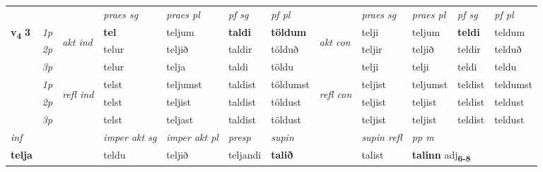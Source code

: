 \begin{longtable}[l]{X>{\footnotesize\itshape}llXXXXlXXXX}
 & &   & \textit{praes sg}  & \textit{praes pl}    & \textit{ pf sg} & \textit{pf pl} & & \textit{praes sg}  & \textit{praes pl}    & \textit{pf sg} & \textit{pf pl }  \\ \cmidrule{4-7} \cmidrule{9-12}
 \multirow{2}{*}{{{\textbf{v{\textsubscript{4}}} \Large{\textbf{3}}}}}  & 1p & \multirow{3}{*}{\begin{turn}{90}\textit{akt ind}\end{turn}} & \textbf{tel} & teljum & \textbf{taldi} & \textbf{töldum} & \multirow{3}{*}{\begin{turn}{90}\textit{akt con}\end{turn}} &telji & teljum & \textbf{teldi} & teldum\\*
 & 2p &  &  telur  & teljið & taldir & tölduð & & teljir & teljið & teldir & telduð \\*
 & 3p &  & telur & telja & taldi & töldu & & telji & telji& teldi & teldu \\*
\cmidrule{4-7} \cmidrule{9-12}
 & 1p & \multirow{3}{*}{\begin{turn}{90}\textit{refl ind}\end{turn}}  & telst & teljumst & taldist & töldumst & \multirow{3}{*}{\begin{turn}{90}\textit{refl con}\end{turn}}  &teljist & teljumst & teldist & teldumst \\*
 & 2p &  & telst & teljist & taldist & töldust & &teljist & teljist & teldist & teldust \\*
 & 3p  & & telst & teljast & taldist & töldust & & teljist & teljist& teldist & teldust \\*
\cmidrule{4-7} \cmidrule{9-12}

   {\textit{inf}} & &  & \textit{imper akt sg} & \textit{imper akt pl}   & \textit{presp} & \textit{supin} && \textit{supin refl} & \textit{pp m} \\*
  {\textbf{telja}} & && teldu  & teljið   & teljandi &  \textbf{talið} && talist & \multicolumn{2}{l}{\textbf{talinn} adj\textbf{\textsubscript{6-8}}} \\*

\midrule


\end{longtable}
